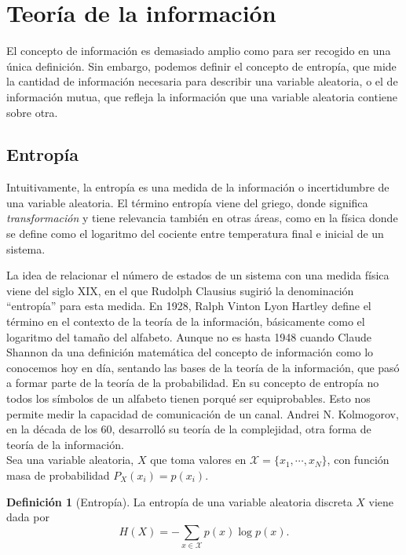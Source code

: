 \documentclass[10pt,a4paper]{article} %
\theoremstyle{definition}
\newtheorem{definition}{Definición}[section]
\begin{document}
     
    \section{Teoría de la información}

    El concepto de información es demasiado amplio como para ser recogido en una única definición. Sin embargo, podemos definir el concepto de entropía, que mide la cantidad de información necesaria para describir una variable aleatoria, o el de información mutua, que refleja la información que una variable aleatoria contiene sobre otra.

    \subsection{Entropía}

    Intuitivamente, la entropía es una medida de la información o incertidumbre de una variable aleatoria. El término entropía viene del griego, donde significa \textit{transformación} y tiene relevancia también en otras áreas, como en la física donde se define como el logaritmo del cociente entre temperatura final e inicial de un sistema.

    La idea de relacionar el número de estados de un sistema con una medida física viene del siglo XIX, en el que Rudolph Clausius sugirió la denominación ``entropía'' para esta medida. En 1928, Ralph Vinton Lyon Hartley define el término en el contexto de la teoría de la información, básicamente como el logaritmo del tamaño del alfabeto. Aunque no es hasta 1948 cuando Claude Shannon da una definición matemática del concepto de información como lo conocemos hoy en día,  sentando las bases de la teoría de la información, que pasó a formar parte de la teoría de la probabilidad. En su concepto de entropía no todos los símbolos de un alfabeto tienen porqué ser equiprobables. Esto nos permite medir la capacidad de comunicación de un canal. Andrei N. Kolmogorov, en la década de los 60, desarrolló su teoría de la complejidad, otra forma de teoría de la información.\\

Sea una variable aleatoria, $X$ que toma valores en $\mathcal{X} = \{x_1, \cdots, x_N \}$, con función masa de probabilidad $P_X(x_i) = p(x_i)$.

\begin{definition}[Entropía]
  La entropía de una variable aleatoria discreta $X$ viene dada por \[H(X) = - \sum_{x\in \mathcal{X}} p(x) \log p(x).\]
\end{definition}
\end{document}

